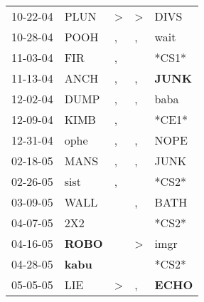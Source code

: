 \begin{supertabular}{p{0.07\textwidth}p{0.06\textwidth}p{0.02\textwidth}p{0.02\textwidth}p{0.06\textwidth}}
          10-22-04\textsuperscript{} &           PLUN\textsuperscript{} &     \textgreater &     \textgreater &           DIVS\textsuperscript{} \\
          10-28-04\textsuperscript{} &           POOH\textsuperscript{} &                , &                , &           wait\textsuperscript{} \\
          11-03-04\textsuperscript{} &            FIR\textsuperscript{} &                , &                  &                            *CS1* \\
          11-13-04\textsuperscript{} &           ANCH\textsuperscript{} &                , &                , &  \textbf{JUNK\textsuperscript{}} \\
          12-02-04\textsuperscript{} &           DUMP\textsuperscript{} &                , &                , &           baba\textsuperscript{} \\
          12-09-04\textsuperscript{} &           KIMB\textsuperscript{} &                , &                  &                            *CE1* \\
          12-31-04\textsuperscript{} &           ophe\textsuperscript{} &                , &                , &           NOPE\textsuperscript{} \\
          02-18-05\textsuperscript{} &           MANS\textsuperscript{} &                , &                , &           JUNK\textsuperscript{} \\
          02-26-05\textsuperscript{} &           sist\textsuperscript{} &                , &                  &                            *CS2* \\
          03-09-05\textsuperscript{} &           WALL\textsuperscript{} &                  &                , &           BATH\textsuperscript{} \\
          04-07-05\textsuperscript{} &            2X2\textsuperscript{} &                  &                  &                            *CS2* \\
          04-16-05\textsuperscript{} &  \textbf{ROBO\textsuperscript{}} &                  &     \textgreater &           imgr\textsuperscript{} \\
          04-28-05\textsuperscript{} &  \textbf{kabu\textsuperscript{}} &                  &                  &                            *CS2* \\
          05-05-05\textsuperscript{} &            LIE\textsuperscript{} &     \textgreater &                , &  \textbf{ECHO\textsuperscript{}} \\

\end{supertabular}
